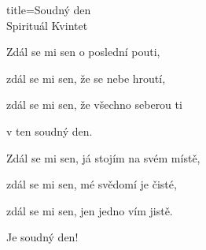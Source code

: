 \begin{song}{title=\predtitle\centering Soudný den \\\large Spirituál Kvintet   \vspace*{-0.3cm}}
\begin{centerjustified}
\begin{varwidth}[t]{0.52\textwidth}
\sloka
Zdál se mi sen o poslední pouti,

zdál se mi sen, že se nebe hroutí,

zdál se mi sen, že všechno seberou ti

v ten soudný den.


\sloka
Zdál se mi sen, já stojím na svém místě,

zdál se mi sen, mé svědomí je čisté,

zdál se mi sen, jen jedno vím jistě.

Je soudný den!



\end{varwidth}

\end{centerjustified}
\setcounter{Slokočet}{0}
\end{song}
